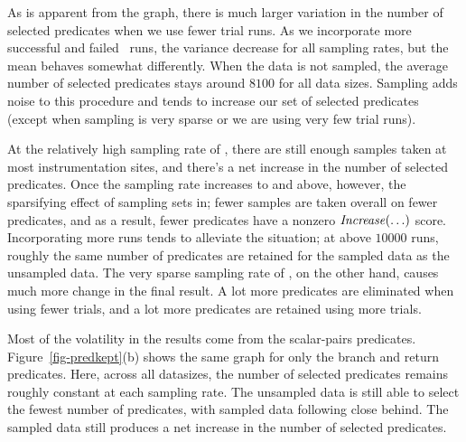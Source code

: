 As is apparent from the graph, there is much larger variation in the
number of selected predicates when we use fewer trial runs.
As we incorporate more successful and failed \moss\ runs, the variance
decrease for all sampling rates, but the mean behaves
somewhat differently.  When the data is not sampled, the average
number of selected predicates stays around $8100$ for all data sizes.
Sampling adds noise to this procedure and tends to increase our set of
selected predicates (except when sampling is very sparse or we are
using very few trial runs).

At the relatively high sampling rate of
, there are still enough samples taken at most
instrumentation sites, and there's a net increase in the number of
selected predicates.  Once the sampling rate increases to
 and above, however, the sparsifying effect of
sampling sets in; fewer samples are taken overall on fewer predicates,
and as a result, fewer predicates have a nonzero $\mbox{\textit{Increase}}(\ldots)$ score.
Incorporating more runs tends to alleviate the situation; at above
$10000$ runs, roughly the same number of predicates are retained for
the  sampled data as the unsampled data.  The very
sparse sampling rate of , on the other hand,
causes much more change in the final result.  A lot more predicates
are eliminated when using fewer trials, and a lot more predicates are
retained using more trials.

Most of the volatility in the results come from the scalar-pairs
predicates.  Figure~\ref{fig-predkept}(b) shows the same graph for
only the branch and return predicates.  Here, across all datasizes,
the number of selected predicates remains roughly constant at each
sampling rate.  The unsampled data is still able to select the fewest
number of predicates, with  sampled data following
close behind.  The  sampled data still produces a
net increase in the number of selected predicates.

